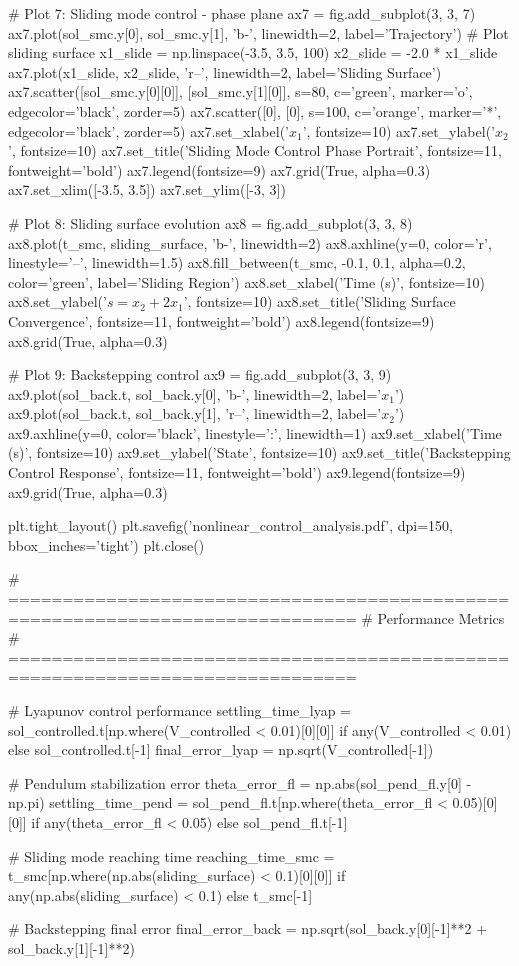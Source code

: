 \documentclass[a4paper, 11pt]{article}
\begin{document}
\begin{pycode}
# Plot 7: Sliding mode control - phase plane
ax7 = fig.add_subplot(3, 3, 7)
ax7.plot(sol_smc.y[0], sol_smc.y[1], 'b-', linewidth=2, label='Trajectory')
# Plot sliding surface
x1_slide = np.linspace(-3.5, 3.5, 100)
x2_slide = -2.0 * x1_slide
ax7.plot(x1_slide, x2_slide, 'r--', linewidth=2, label='Sliding Surface')
ax7.scatter([sol_smc.y[0][0]], [sol_smc.y[1][0]], s=80, c='green',
           marker='o', edgecolor='black', zorder=5)
ax7.scatter([0], [0], s=100, c='orange', marker='*', edgecolor='black', zorder=5)
ax7.set_xlabel('$x_1$', fontsize=10)
ax7.set_ylabel('$x_2$', fontsize=10)
ax7.set_title('Sliding Mode Control Phase Portrait', fontsize=11, fontweight='bold')
ax7.legend(fontsize=9)
ax7.grid(True, alpha=0.3)
ax7.set_xlim([-3.5, 3.5])
ax7.set_ylim([-3, 3])

# Plot 8: Sliding surface evolution
ax8 = fig.add_subplot(3, 3, 8)
ax8.plot(t_smc, sliding_surface, 'b-', linewidth=2)
ax8.axhline(y=0, color='r', linestyle='--', linewidth=1.5)
ax8.fill_between(t_smc, -0.1, 0.1, alpha=0.2, color='green',
                label='Sliding Region')
ax8.set_xlabel('Time (s)', fontsize=10)
ax8.set_ylabel('$s = x_2 + 2x_1$', fontsize=10)
ax8.set_title('Sliding Surface Convergence', fontsize=11, fontweight='bold')
ax8.legend(fontsize=9)
ax8.grid(True, alpha=0.3)

# Plot 9: Backstepping control
ax9 = fig.add_subplot(3, 3, 9)
ax9.plot(sol_back.t, sol_back.y[0], 'b-', linewidth=2, label='$x_1$')
ax9.plot(sol_back.t, sol_back.y[1], 'r--', linewidth=2, label='$x_2$')
ax9.axhline(y=0, color='black', linestyle=':', linewidth=1)
ax9.set_xlabel('Time (s)', fontsize=10)
ax9.set_ylabel('State', fontsize=10)
ax9.set_title('Backstepping Control Response', fontsize=11, fontweight='bold')
ax9.legend(fontsize=9)
ax9.grid(True, alpha=0.3)

plt.tight_layout()
plt.savefig('nonlinear_control_analysis.pdf', dpi=150, bbox_inches='tight')
plt.close()

# ==============================================================================
# Performance Metrics
# ==============================================================================

# Lyapunov control performance
settling_time_lyap = sol_controlled.t[np.where(V_controlled < 0.01)[0][0]] if any(V_controlled < 0.01) else sol_controlled.t[-1]
final_error_lyap = np.sqrt(V_controlled[-1])

# Pendulum stabilization error
theta_error_fl = np.abs(sol_pend_fl.y[0] - np.pi)
settling_time_pend = sol_pend_fl.t[np.where(theta_error_fl < 0.05)[0][0]] if any(theta_error_fl < 0.05) else sol_pend_fl.t[-1]

# Sliding mode reaching time
reaching_time_smc = t_smc[np.where(np.abs(sliding_surface) < 0.1)[0][0]] if any(np.abs(sliding_surface) < 0.1) else t_smc[-1]

# Backstepping final error
final_error_back = np.sqrt(sol_back.y[0][-1]**2 + sol_back.y[1][-1]**2)

\end{pycode}
\end{document}

